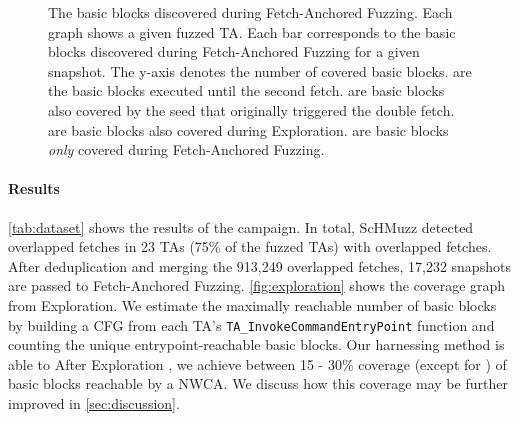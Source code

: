 \documentclass[conference]{IEEEtran} %
\newcommand{\sysname}{ScHMuzz\xspace}
\newcommand{\stageone}{Exploration\xspace}
\newcommand{\stagetwo}{Fetch-Anchored Fuzzing\xspace} %
\newcommand{\kinibi}{Kinibi\xspace}
\newcommand{\numTAsdf}{23\xspace}
\newcommand{\numdfs}{913,249\xspace}
\newcommand{\numdfsmerge}{17,232\xspace}
\providecommand{\DIFaddtex}[1]{{\protect\color{blue} \sf #1}} %
\providecommand{\DIFdeltex}[1]{{\protect\color{red} \scriptsize #1}} %
\providecommand{\DIFaddbegin}{} %
\providecommand{\DIFaddend}{} %
\providecommand{\DIFdelbegin}{} %
\providecommand{\DIFdelend}{} %
\providecommand{\DIFadd}[1]{\texorpdfstring{\DIFaddtex{#1}}{#1}} %
\providecommand{\DIFdel}[1]{\texorpdfstring{\DIFdeltex{#1}}{}} %
\begin{document}
\begin{figure}
\begin{tikzpicture}
    \end{tikzpicture}
    \caption{
        The basic blocks discovered during \stagetwo. Each graph shows a given fuzzed TA. Each bar corresponds to the basic blocks discovered during \stagetwo for a given snapshot. The y-axis denotes the number of covered basic blocks.  
    \protect{} are the basic blocks executed until the second fetch. 
    \protect{} are basic blocks also covered by the seed that originally triggered the double fetch. 
    \protect{} are basic blocks also covered during \stageone. 
    \protect{} are basic blocks \emph{only} covered during \stagetwo. 
    }
    \label{fig:df}
\end{figure}

\DIFdelbegin \paragraph{\DIFdel{Results}}
\addtocounter{paragraph}{-1}%

\DIFdelend \autoref{tab:dataset} shows the results of the campaign. In total, \sysname detected 
\DIFaddbegin \DIFadd{overlapped fetches in }\DIFaddend \numTAsdf{} TAs (75\% of the fuzzed TAs)\DIFdelbegin \DIFdel{with overlapped fetches}\DIFdelend . 
After deduplication and merging the \numdfs{} overlapped fetches, \numdfsmerge snapshots 
are passed to \stagetwo. \autoref{fig:exploration} shows the coverage graph from \stageone. 
We estimate the maximally reachable number of basic blocks by building a CFG from each TA's
\texttt{TA\_InvokeCommandEntryPoint} function and counting the unique entrypoint-reachable basic blocks. 
\DIFdelbegin \DIFdel{Our harnessing method is able to }\DIFdelend \DIFaddbegin \DIFadd{After }\stageone\DIFadd{, we }\DIFaddend achieve between 15 - 30\% coverage \DIFdelbegin \DIFdel{(except for }%
\DIFdel{)}\DIFdelend \DIFaddbegin \DIFadd{of basic blocks reachable by a NWCA}\DIFaddend .
We discuss how this coverage may be further improved in \autoref{sec:discussion}.
\end{document}

